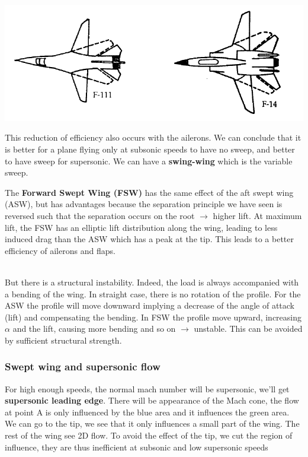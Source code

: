 \begin{center}
\begin{minipage}{0.25\textwidth}
	\label{ch7/12}
	\end{minipage}
	\begin{minipage}{0.3\textwidth}
	\includegraphics[scale=0.2]{ch7/13}
	\label{ch7/13}
	\end{minipage}
	\end{center}		
	
	This reduction of efficiency also occurs with the ailerons. We can conclude that it is better for a plane flying only at subsonic speeds to have no sweep, and better to have sweep for supersonic. We can have a \textbf{swing-wing} which is the variable sweep. 
	
	The \textbf{Forward Swept Wing (FSW)} has the same effect of the aft swept wing (ASW), but has advantages because the separation principle we have seen is reversed such that the separation occurs on the root $\rightarrow$ higher lift. At maximum lift, the FSW has an elliptic lift distribution along the wing, leading to less induced drag than the ASW which has a peak at the tip. This leads to a better efficiency of ailerons and flaps. 
	
	\ \\
	
	But there is a structural instability. Indeed, the load is always accompanied with a bending of the wing. In straight case, there is no rotation of the profile. For the ASW the profile will move downward implying a decrease of the angle of attack (lift) and compensating the bending. In FSW the profile move upward, increasing $\alpha$ and the lift, causing more bending and so on $\rightarrow$ unstable. This can be avoided by sufficient structural strength. 
	
\subsubsection{Swept wing and supersonic flow}
	For high enough speeds, the normal mach number will be supersonic, we'll get \textbf{supersonic leading edge}. There will be appearance of the Mach cone, the flow at point A is only influenced by the blue area and it influences the green area. We can go to the tip, we see that it only influences a small part of the wing. The rest of the wing see 2D flow. To avoid the effect of the tip, we cut the region of influence, they are thus inefficient at subsonic and low supersonic speeds
	
